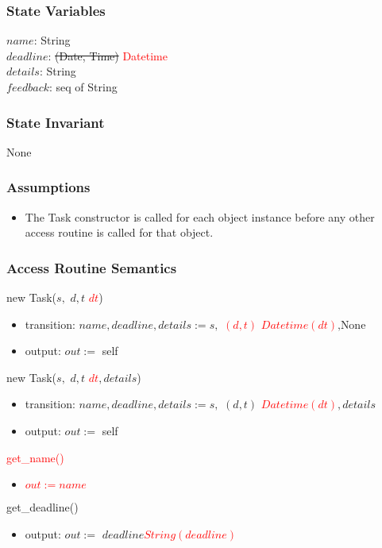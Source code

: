 \documentclass[12pt, titlepage]{article}
\begin{document}
\subsubsection*{State Variables}
$name$: String\\
$deadline$: \sout{(Date, Time)} \textcolor{red}{Datetime}\\
$details$: String\\
$feedback$: seq of String

\subsubsection*{State Invariant}
None

\subsubsection*{Assumptions}
\begin{itemize}
  \item The Task constructor is called for each object instance before any other access routine is called for that object.
\end{itemize}

\subsubsection*{Access Routine Semantics}
\noindent new Task($s,$ \sout{$d, t$} \textcolor{red}{$dt$})
\begin{itemize}
    \item transition: $name, deadline, details := s,$ \textcolor{red}{\sout{$(d, t)$} $Datetime(dt)$}$, \text{None}$
    \item output: $out :=$ self
\end{itemize}

\noindent new Task($s,$ \sout{$d, t$} \textcolor{red}{$dt$}$, details$)
\begin{itemize}
    \item transition: $name, deadline, details := s,$ \sout{$(d, t)$} \textcolor{red}{$Datetime(dt)$}$, details$
    \item output: $out :=$ self
\end{itemize}

\noindent \textcolor{red}{get\_name()}
\begin{itemize}
    \item \textcolor{red}{$out := name$}
\end{itemize}

\noindent get\_deadline()
\begin{itemize}
    \item output: $out :=$ \sout{$deadline$}\textcolor{red}{$String(deadline)$}
\end{itemize}
\end{document}
